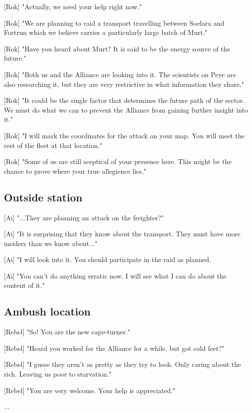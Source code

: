 \documentclass[a4paper,12pt]{article}
\begin{document}
[Rok] "Actually, we need your help right now." 

[Rok] "We are planning to raid a transport travelling between Soelara and Fortrun which
we believe carries a particularly large batch of Murt."

[Rok] "Have you heard about Murt? It is said to be the energy source of the future."

[Rok] "Both us and the Alliance are looking into it. The scientists on Peye are also researching it,
but they are very restrictive in what information they share."

[Rok] "It could be the single factor that determines the future path of the sector. We must
do what we can to prevent the Alliance from gaining further insight into it."

[Rok] "I will mark the coordinates for the attack on your map. You will meet the rest of the
fleet at that location."

[Rok] "Some of us are still sceptical of your presence here. This might be
the chance to prove where your true allegience lies."

\subsection{Outside station}

[Ai] "...They are planning an attack on the freighter?" 

[Ai] "It is surprising that they know about the transport. They must have more insiders than we know about..."

[Ai] "I will look into it. You should participate in the raid as planned. 

[Ai] "You can't do anything erratic now. I will see what I can do about the content of it."

\subsection{Ambush location}

[Rebel] "So! You are the new cape-turner."

[Rebel] "Heard you worked for the Alliance for a while, but got cold feet?" 

[Rebel] "I guess they aren't as pretty as they try to look. Only caring about the rich. 
Leaving us poor to starvation."

[Rebel] "You are very welcome. Your help is appreciated."

...
\end{document}
